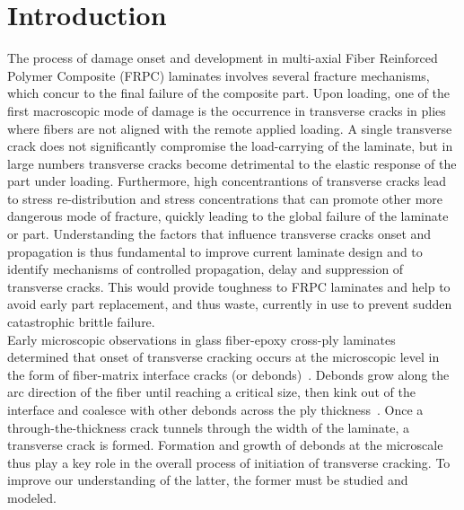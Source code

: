 \documentclass[smallextended]{svjour3}       %
\begin{document}

\section{Introduction}

The process of damage onset and development in multi-axial Fiber Reinforced Polymer Composite (FRPC) laminates involves several fracture mechanisms, which concur to the final failure of the composite part. Upon loading, one of the first macroscopic mode of damage is the occurrence in transverse cracks in plies where fibers are not aligned with the remote applied loading. A single transverse crack does not significantly compromise the load-carrying of the laminate, but in large numbers transverse cracks become detrimental to the elastic response of the part under loading. Furthermore, high concentrantions of transverse cracks lead to stress re-distribution and stress concentrations that can promote other more dangerous mode of fracture, quickly leading to the global failure of the laminate or part. Understanding the factors that influence transverse cracks onset and propagation is thus fundamental to improve current laminate design and to identify mechanisms of controlled propagation, delay and suppression of transverse cracks. This would provide toughness to FRPC laminates and help to avoid early part replacement, and thus waste, currently in use to prevent sudden catastrophic brittle failure.\\
Early microscopic observations in glass fiber-epoxy cross-ply laminates determined that onset of transverse cracking occurs at the microscopic level in the form of fiber-matrix interface cracks (or debonds)~\cite{Bailey1981}. Debonds grow along the arc direction of the fiber until reaching a critical size, then kink out of the interface and coalesce with other debonds across the ply thickness~\cite{Zhang1997}. Once a through-the-thickness crack tunnels through the width of the laminate, a transverse crack is formed. Formation and growth of debonds at the microscale thus play a key role in the overall process of initiation of transverse cracking. To improve our understanding of the latter, the former must be studied and modeled.\\
\end{document}
